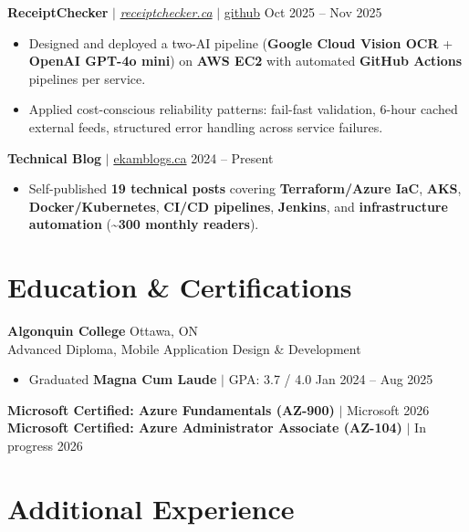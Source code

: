 \documentclass[11pt,a4paper]{article}
\begin{document}
\vspace{4pt}

\textbf{ReceiptChecker} $|$ \href{https://receiptchecker.ca/}{\emph{receiptchecker.ca}} $|$ \href{https://github.com/bhat0155/receipt-check}{\small github} \hfill Oct 2025 -- Nov 2025
\begin{itemize}
    \item Designed and deployed a two-AI pipeline (\textbf{Google Cloud Vision OCR} + \textbf{OpenAI GPT-4o mini}) on \textbf{AWS EC2} with automated \textbf{GitHub Actions} pipelines per service.
    \item Applied cost-conscious reliability patterns: fail-fast validation, 6-hour cached external feeds, structured error handling across service failures.
\end{itemize}

\vspace{4pt}

\textbf{Technical Blog} $|$ \href{https://www.ekamblogs.ca}{ekamblogs.ca} \hfill 2024 -- Present
\begin{itemize}
    \item Self-published \textbf{19 technical posts} covering \textbf{Terraform/Azure IaC}, \textbf{AKS}, \textbf{Docker/Kubernetes}, \textbf{CI/CD pipelines}, \textbf{Jenkins}, and \textbf{infrastructure automation} (\textasciitilde\textbf{300 monthly readers}).
\end{itemize}

\section{Education \& Certifications}

\textbf{Algonquin College} \hfill Ottawa, ON \\
Advanced Diploma, Mobile Application Design \& Development
\begin{itemize}
    \item Graduated \textbf{Magna Cum Laude} $|$ GPA: 3.7 / 4.0 \hfill Jan 2024 -- Aug 2025
\end{itemize}
\textbf{Microsoft Certified: Azure Fundamentals (AZ-900)} $|$ Microsoft \hfill 2026 \\
\textbf{Microsoft Certified: Azure Administrator Associate (AZ-104)} $|$ In progress \hfill 2026

\section{Additional Experience}
\end{document}
